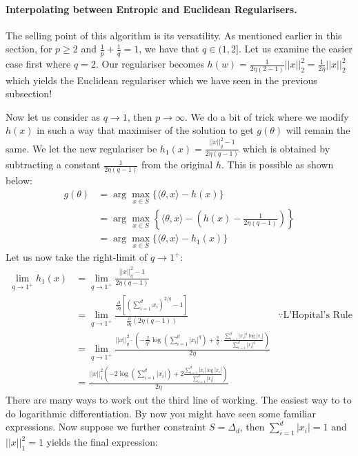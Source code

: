 \paragraph{Interpolating between Entropic and Euclidean Regularisers.} The selling point of this algorithm is its versatility. As mentioned earlier in this section, for $p \geq 2$ and $\frac{1}{p} + \frac{1}{q} = 1$, we have that $q \in (1, 2]$. Let us examine the easier case first where $q = 2$. Our regulariser becomes $h(w) = \frac{1}{2\eta(2-1)}||x||_2^2 = \frac{1}{2\eta} ||x||_2^2$ which yields the Euclidean regulariser which we have seen in the previous subsection!

Now let us consider as $q \to 1$, then $p \to \infty$. We do a bit of trick where we modify $h(x)$ in such a way that maximiser of the solution to get $g(\theta)$ will remain the same. We let the new regulariser be $h_1(x) = \frac{||x||_q^2 - 1}{2\eta(q-1)}$ which is obtained by subtracting a constant $\frac{1}{2\eta (q-1)}$ from the original $h$. This is possible as shown below:
\begin{align*}
    g(\theta) &= \arg\max_{x \in S} \{\langle \theta, x \rangle - h(x)\}\\
     &= \arg\max_{x \in S} \left\{\langle \theta, x \rangle - \left(h(x) - \frac{1}{2\eta (q-1)}\right)\right\}\\
     &= \arg\max_{x \in S} \{\langle \theta, x \rangle - h_1(x)\}
\end{align*}
Let us now take the right-limit of $q \to 1^+$:
\begin{align*}
    \lim_{q \to 1^+} h_1(x) &= \lim_{q \to 1^+} \frac{||x||_q^2 - 1}{2\eta(q-1)}\\
    &= \lim_{q \to 1^+}\frac{\frac{\partial}{\partial q}[(\sum_{i=1}^d x_i)^{2/q}-1]}{\frac{\partial}{\partial q}(2 \eta (q-1))} &\because \text{L'Hopital's Rule}\\
    &= \lim_{q \to 1^+}\frac{||x||_q^2 \cdot \left(-\frac{2}{q^2}\log(\sum_{i=1}^d|x_i|^q) + \frac{2}{q}\cdot \frac{\sum_{i=1}^d|x_i|^q\log|x_i|}{\sum_{i=1}^d |x_i|^q}\right)}{2\eta}\\
    &= \frac{||x||_1^2(-2 \log(\sum_{i=1}^d |x_i|)+ 2 \frac{\sum_{i=1}^d |x_i|\log|x_i|}{\sum_{i=1}^d |x_i|})}{2\eta}
\end{align*}
There are many ways to work out the third line of working. The easiest way to to do logarithmic differentiation.
By now you might have seen some familiar expressions. Now suppose we further constraint $S = \Delta_d$, then $\sum_{i=1}^d |x_i| =1$ and $||x||_1^2 = 1$ yields the final expression:
